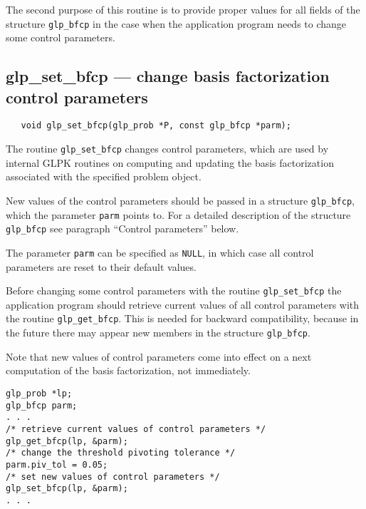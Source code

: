 The second purpose of this routine is to provide proper values for all
fields of the structure \verb|glp_bfcp| in the case when the
application program needs to change some control parameters.

\subsection{glp\_set\_bfcp --- change basis factorization control
parameters}

\synopsis

\begin{verbatim}
   void glp_set_bfcp(glp_prob *P, const glp_bfcp *parm);
\end{verbatim}

\description

The routine \verb|glp_set_bfcp| changes control parameters, which are
used by internal GLPK routines on computing and updating the basis
factorization associated with the specified problem object.

New values of the control parameters should be passed in a structure
\verb|glp_bfcp|, which the parameter \verb|parm| points to. For a
detailed description of the structure \verb|glp_bfcp| see paragraph
``Control parameters'' below.

The parameter \verb|parm| can be specified as \verb|NULL|, in which
case all control parameters are reset to their default values.


Before changing some control parameters with the routine
\verb|glp_set_bfcp| the application program should retrieve current
values of all control parameters with the routine \verb|glp_get_bfcp|.
This is needed for backward compatibility, because in the future there
may appear new members in the structure \verb|glp_bfcp|.

Note that new values of control parameters come into effect on a next
computation of the basis factorization, not immediately.


\begin{footnotesize}
\begin{verbatim}
glp_prob *lp;
glp_bfcp parm;
. . .
/* retrieve current values of control parameters */
glp_get_bfcp(lp, &parm);
/* change the threshold pivoting tolerance */
parm.piv_tol = 0.05;
/* set new values of control parameters */
glp_set_bfcp(lp, &parm);
. . .
\end{verbatim}
\end{footnotesize}

